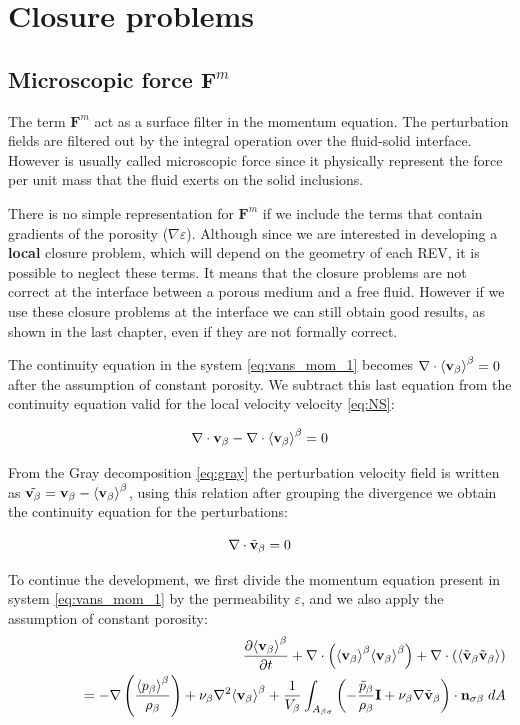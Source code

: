 \section{Closure problems}

\subsection{Microscopic force $\mathbf{F}^m$}
The term $\mathbf{F}^m$ act as a surface filter in the momentum equation. The perturbation fields are filtered out by the integral operation over the fluid-solid interface. However is usually called microscopic force since it physically represent the force per unit mass that the fluid exerts on the solid inclusions.

There is no simple representation for $\mathbf{F}^m$ if we include the terms that contain gradients of the porosity ($\nabla \varepsilon$).
Although since we are interested in developing a \textbf{local} closure problem, which will depend on the geometry of each REV, it is possible to neglect these terms.
It means that the closure problems are not correct at the interface between a porous medium and a free fluid. 
However if we use these closure problems at the interface we can still obtain good results, as shown in the last chapter, even if they are not formally correct.

The continuity equation in the system \eqref{eq:vans_mom_1} becomes $ \nabla \cdot  {\left< \textbf{v}_{\beta}\right>}^{\beta}=0$ after the assumption of constant porosity.
We subtract this last equation from the continuity equation valid for the local velocity velocity \eqref{eq:NS}:

$$
\nabla \cdot  \textbf{v}_{\beta} - \nabla \cdot  {\left< \textbf{v}_{\beta}\right>}^{\beta} = 0
$$

From the Gray decomposition \eqref{eq:gray} the perturbation velocity field is written as $\tilde{\textbf{v}_{\beta}} = \textbf{v}_{\beta} - {\left< \textbf{v}_{\beta} \right>}^{\beta}$, using this relation after grouping the divergence we obtain the continuity equation for the perturbations:

\begin{equation}
\nabla \cdot \tilde{\textbf{v}}_{\beta} = 0 
\end{equation}


To continue the development, we first divide the momentum equation present in system \ref{eq:vans_mom_1} by the permeability $\varepsilon$, and we also apply the assumption of constant porosity:
\begin{eqnarray}
&& \dfrac{\partial {\left< \textbf{v}_{\beta}\right>}^{\beta}}{\partial t} + \nabla \cdot \left({\left< \textbf{v}_{\beta} \right>}^{\beta}{\left< \textbf{v}_{\beta} \right>}^{\beta}\right)   + \nabla \cdot \left({\left< \tilde{\textbf{v}}_{\beta} \tilde{\textbf{v}}_{\beta} \right>}\right)   \nonumber \\
&& \qquad \qquad = - \nabla \left(\dfrac{{\left< p_{\beta} \right>}^{\beta}}{\rho_{\beta}}\right) + \nu_{\beta}  \nabla^2 {\left< \textbf{v}_{\beta} \right>}^{\beta} + \dfrac{1}{V_\beta} \displaystyle\int_{A_{\beta \sigma}} \left(-\dfrac{\tilde{p}_{\beta}}{\rho_{\beta}} \mathbf{I}  + \nu_{\beta} \nabla \tilde{\textbf{v}}_{\beta} \right)\cdot \mathbf{n}_{\sigma \beta} \;dA  \nonumber
\end{eqnarray}



